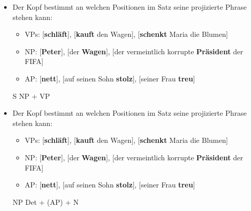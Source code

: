 \begin{frame}

\begin{itemize}
	\item Der Kopf bestimmt an welchen Positionen im Satz seine projizierte Phrase stehen kann:
	\begin{itemize}
		\item VPs: [\textbf{schläft}], [\textbf{kauft} den Wagen], [\textbf{schenkt} Maria die Blumen]
		\item NP: [\textbf{Peter}], [der \textbf{Wagen}], [der vermeintlich korrupte \textbf{Präsident} der FIFA]
		\item AP: [\textbf{nett}], [auf seinen Sohn \textbf{stolz}], [seiner Frau \textbf{treu}]
\end{itemize}
	\pause

\eal S \ras NP + VP
\zl
	
	
\end{itemize}

\end{frame}


\begin{frame}

\begin{itemize}
	\item Der Kopf bestimmt an welchen Positionen im Satz seine projizierte Phrase stehen kann:
	\begin{itemize}
		\item VPs: [\textbf{schläft}], [\textbf{kauft} den Wagen], [\textbf{schenkt} Maria die Blumen]
		\item NP: [\textbf{Peter}], [der \textbf{Wagen}], [der vermeintlich korrupte \textbf{Präsident} der FIFA]
		\item AP: [\textbf{nett}], [auf seinen Sohn \textbf{stolz}], [seiner Frau \textbf{treu}]
\end{itemize}
	\pause

\eal NP \ras Det + (AP) + N
\zl
	
	
\end{itemize}

\end{frame}

